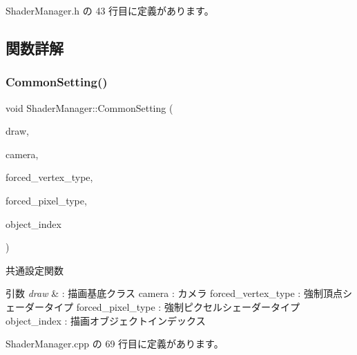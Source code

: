  Shader\+Manager.\+h の 43 行目に定義があります。



\subsection{関数詳解}
\mbox{\label{class_shader_manager_a6cfff8f4aee59d9bc5162a5a6f4d07d4}} 
\subsubsection{\texorpdfstring{Common\+Setting()}{CommonSetting()}}
{\footnotesize\ttfamily void Shader\+Manager\+::\+Common\+Setting (\begin{DoxyParamCaption}\item[{\mbox{\hyperlink{class_draw_base}{Draw\+Base}} $\ast$}]{draw,  }\item[{\mbox{\hyperlink{class_camera}{Camera}} $\ast$}]{camera,  }\item[{\mbox{\hyperlink{class_shader_manager_a9b51e49d70eb3cc58f6d1f3994e8cfbd}{Vertex\+Shader\+Type}}}]{forced\+\_\+vertex\+\_\+type,  }\item[{\mbox{\hyperlink{class_shader_manager_a7d15d773b3c6a99dd7086c45c8b0be5f}{Pixel\+Shader\+Type}}}]{forced\+\_\+pixel\+\_\+type,  }\item[{unsigned}]{object\+\_\+index }\end{DoxyParamCaption})}



共通設定関数 


\begin{DoxyParams}{引数}
{\em draw} & \+: 描画基底クラス camera \+: カメラ forced\+\_\+vertex\+\_\+type \+: 強制頂点シェーダータイプ forced\+\_\+pixel\+\_\+type \+: 強制ピクセルシェーダータイプ object\+\_\+index \+: 描画オブジェクトインデックス \\
\hline
\end{DoxyParams}


 Shader\+Manager.\+cpp の 69 行目に定義があります。


